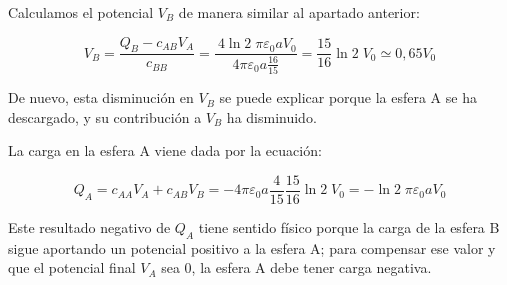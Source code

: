 \begin{enumerate}
    Calculamos el potencial $V_B$ de manera similar al apartado anterior:

    \begin{equation*}
        V_B = \frac{Q_B - c_{AB} V_A}{c_{BB}} =
        \frac{\ 4 \ln2\;\pi \varepsilon_0 a V_0}{4 \pi \varepsilon_0 a \frac{16}{15}} =
        \frac{15}{16}\ln2\;V_0 \simeq 0,65 V_0
    \end{equation*}

    De nuevo, esta disminución en $V_B$ se puede explicar porque la esfera A se ha descargado, y su contribución a $V_B$ ha disminuido.

    La carga en la esfera A viene dada por la ecuación:

    \begin{equation*}
        Q_A = c_{AA} V_A + c_{AB} V_B =
        - 4 \pi \varepsilon_0 a \frac{4}{15}   \frac{15}{16}\ln2\;V_0 =
        - \ln2\; \pi \varepsilon_0 a V_0
    \end{equation*}

    Este resultado negativo de $Q_A$ tiene sentido físico porque la carga de la esfera B sigue aportando un potencial positivo a la esfera A;
    para compensar ese valor y que el potencial final $V_A$ sea 0, la esfera A debe tener carga negativa.


\end{enumerate}